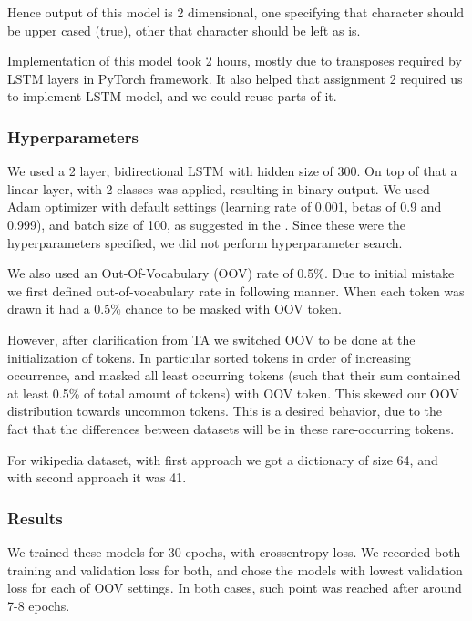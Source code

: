 \documentclass[11pt,a4paper]{article}
\begin{document}
    Hence output of this model is 2 dimensional, one specifying that character should be upper cased (true), other that character should be left as is.

    Implementation of this model took 2 hours, mostly due to transposes required by LSTM layers in PyTorch framework. It also helped that assignment 2 required us to implement LSTM model, and we could reuse parts of it.

    \subsubsection{Hyperparameters}
    We used a 2 layer, bidirectional LSTM with hidden size of 300. On top of that a linear layer, with 2 classes was applied, resulting in binary output. We used Adam \cite{adam} optimizer with default settings (learning rate of 0.001, betas of 0.9 and 0.999), and batch size of 100, as suggested in the \cite{susanto-etal-2016-learning}. Since these were the hyperparameters specified, we did not perform hyperparameter search.

    We also used an Out-Of-Vocabulary (OOV) rate of 0.5\%. Due to initial mistake we first defined out-of-vocabulary rate in following manner. When each token was drawn it had a 0.5\% chance to be masked with OOV token.

    However, after clarification from TA we switched OOV to be done at the initialization of tokens. In particular sorted tokens in order of increasing occurrence, and masked all least occurring tokens (such that their sum contained at least 0.5\% of total amount of tokens) with OOV token. This skewed our OOV distribution towards uncommon tokens. This is a desired behavior, due to the fact that the differences between datasets will be in these rare-occurring tokens.

    For wikipedia dataset, with first approach we got a dictionary of size 64, and with second approach it was 41.

    \subsubsection{Results}
    We trained these models for 30 epochs, with crossentropy loss. We recorded both training and validation loss for both, and chose the models with lowest validation loss for each of OOV settings. In both cases, such point was reached after around 7-8 epochs.
\end{document}
